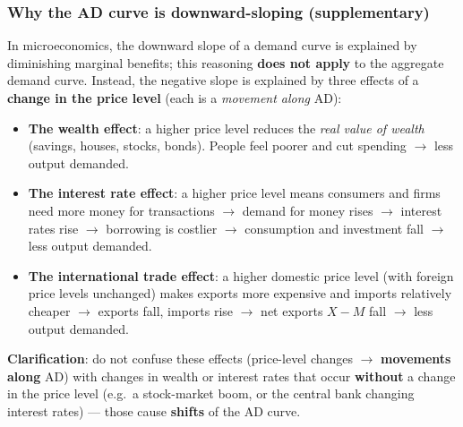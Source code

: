 \documentclass[a4paper,12pt]{article}
\begin{document}
\subsubsection*{Why the AD curve is downward-sloping (supplementary)}
In microeconomics, the downward slope of a demand curve is explained by diminishing marginal benefits; this reasoning \textbf{does not apply} to the aggregate demand curve. Instead, the negative slope is explained by three effects of a \textbf{change in the price level} (each is a \textit{movement along} AD):
\begin{itemize}
  \item \textbf{The wealth effect}: a higher price level reduces the \textit{real value of wealth} (savings, houses, stocks, bonds). People feel poorer and cut spending $\to$ less output demanded.
  \item \textbf{The interest rate effect}: a higher price level means consumers and firms need more money for transactions $\to$ demand for money rises $\to$ interest rates rise $\to$ borrowing is costlier $\to$ consumption and investment fall $\to$ less output demanded.
  \item \textbf{The international trade effect}: a higher domestic price level (with foreign price levels unchanged) makes exports more expensive and imports relatively cheaper $\to$ exports fall, imports rise $\to$ net exports $X - M$ fall $\to$ less output demanded.
\end{itemize}
\textbf{Clarification}: do not confuse these effects (price-level changes $\to$ \textbf{movements along} AD) with changes in wealth or interest rates that occur \textbf{without} a change in the price level (e.g.\ a stock-market boom, or the central bank changing interest rates) --- those cause \textbf{shifts} of the AD curve.
\end{document}
